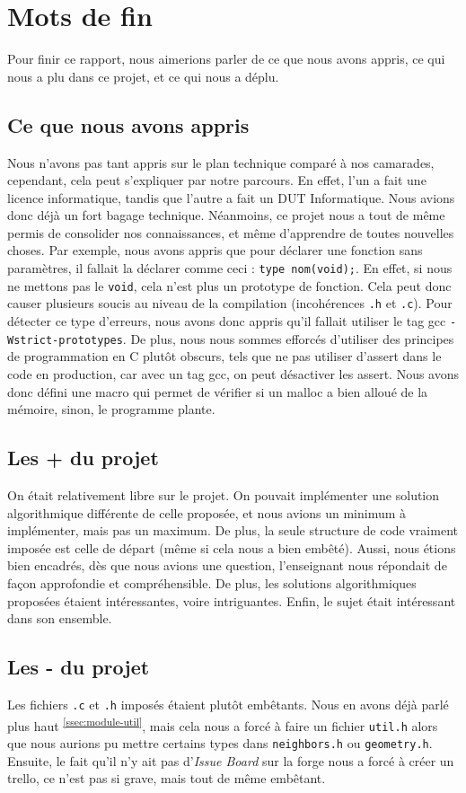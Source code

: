 \section{Mots de fin}
Pour finir ce rapport, nous aimerions parler de ce que nous avons appris, ce qui nous a plu dans ce projet, et ce qui nous a déplu.
\subsection{Ce que nous avons appris}
Nous n'avons pas tant appris sur le plan technique comparé à nos camarades,
cependant, cela peut s'expliquer par notre parcours. En effet, l'un a fait une licence informatique, tandis que l'autre a fait un DUT Informatique.
Nous avions donc déjà un fort bagage technique. Néanmoins, ce projet nous a tout de même permis de consolider nos connaissances,
et même d'apprendre de toutes nouvelles choses. Par exemple, nous avons appris que pour déclarer une fonction sans paramètres,
il fallait la déclarer comme ceci : \verb|type nom(void);|. En effet, si
nous ne mettons pas le \verb|void|, cela n'est plus un prototype de fonction.
Cela peut donc causer plusieurs soucis au niveau de la compilation (incohérences \verb|.h| et \verb|.c|).
Pour détecter ce type d'erreurs, nous avons donc appris qu'il fallait utiliser le tag gcc \verb|-Wstrict-prototypes|.
De plus, nous nous sommes efforcés d'utiliser des principes de programmation en C plutôt obscurs,
tels que ne pas utiliser d'assert dans le code en production, car avec un tag gcc, on peut désactiver les assert.
Nous avons donc défini une macro qui permet de vérifier si un malloc a bien alloué de la mémoire, sinon, le programme plante.

\subsection{Les + du projet}
On était relativement libre sur le projet. On pouvait implémenter une solution algorithmique différente de celle proposée,
et nous avions un minimum à implémenter, mais pas un maximum. De plus, la seule structure de code vraiment imposée est
celle de départ (même si cela nous a bien embêté). Aussi, nous étions bien encadrés,
dès que nous avions une question, l'enseignant nous répondait de façon approfondie et compréhensible.
De plus, les solutions algorithmiques proposées étaient intéressantes, voire intriguantes.
Enfin, le sujet était intéressant dans son ensemble.

\subsection{Les - du projet}
Les fichiers \verb|.c| et \verb|.h| imposés étaient plutôt embêtants.
Nous en avons déjà parlé plus haut \textsuperscript{\ref{ssec:module-util}}, mais cela nous a forcé à faire un fichier 
\verb|util.h| alors que nous aurions pu mettre certains types dans 
\verb|neighbors.h| ou \verb|geometry.h|. Ensuite, le fait qu'il n'y ait pas 
d'\emph{Issue Board} sur la forge nous a forcé à créer un trello, ce n'est
pas si grave, mais tout de même embêtant.